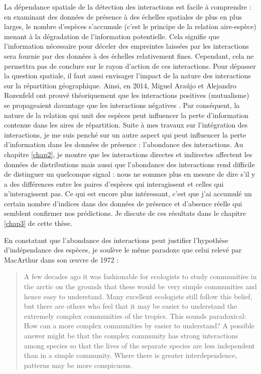 La dépendance spatiale de la détection des interactions est facile à
comprendre : en examinant des données de présence à des échelles
spatiales de plus en plus larges, le nombre d'espèces s'accumule (c'est
le principe de la relation aire-espèce) menant à la dégradation de
l'information potentielle. Cela signifie que l'information nécessaire
pour déceler des empreintes laissées par les interactions sera fournie
par des données à des échelles relativement fines. Cependant, cela ne
permettra pas de conclure sur le rayon d'action de ces interactions.
Pour dépasser la question spatiale, il faut aussi envisager l'impact de
la nature des interactions sur la répartition géographique. Ainsi, en
2014, Miguel Araújo et Alejandro Rozenfeld ont prouvé théoriquement que
les interactions positives (mutualisme) se propageaient davantage que
les interactions négatives \citep{Araujo2014}. Par conséquent, la nature
de la relation qui unit des espèces peut influencer la perte
d'information contenue dans les aires de répartition. Suite à mes
travaux sur l'intégration des interactions, je me suis penché sur un
autre aspect qui peut influencer la perte d'information dans les données
de présence : l'abondance des interactions. Au chapitre \ref{chap2}, je
montre que les interactions directes et indirectes affectent les données
de distributions mais aussi que l'abondance des interactions rend
difficile de distinguer un quelconque signal : nous ne sommes plus en
mesure de dire s'il y a des différences entre les paires d'espèces qui
interagissent et celles qui n'interagissent pas. Ce qui est encore plus
intéressant, c'est que j'ai accumulé un certain nombre d'indices dans
des données de présence et d'absence réelle qui semblent confirmer nos
prédictions. Je discute de ces résultats dans le chapitre \ref{chap3} de
cette thèse.

En constatant que l'abondance des interactions peut justifier
l'hypothèse d'indépendance des espèces, je soulève le même paradoxe que
celui relevé par MacArthur dans son œuvre de 1972
\citep{macarthur1972geographical} :

\begin{quote}
A few decades ago it was fashionable for ecologists to study communities
in the arctic on the grounds that these would be very simple communities
and hence easy to understand. Many excellent ecologists still follow
this belief, but there are others who feel that it may be easier to
understand the extremely complex communities of the tropics. This sounds
paradoxical: How can a more complex communities by easier to understand?
A possible answer might be that the complex community has strong
interactions among species so that the lives of the separate species are
less independent than in a simple community. Where there is greater
interdependence, patterns may be more conspicuous.
\end{quote}

